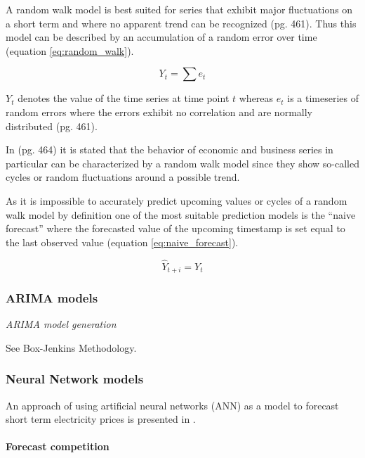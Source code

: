 A random walk model is best suited for series that exhibit major fluctuations on a short term and where no apparent trend can be recognized \cite{makridakisforecasting}(pg. 461). Thus this model can be described by an accumulation of a random error over time (equation \ref{eq:random_walk}). 

\begin{equation}
Y_t = \sum e_t
\label{eq:random_walk}
\end{equation}

$Y_t$ denotes the value of the time series at time point $t$ whereas $e_t$ is a timeseries of random errors where the errors exhibit no correlation and are normally distributed \cite{makridakisforecasting}(pg. 461). 

In \cite{makridakisforecasting}(pg. 464) it is stated that the behavior of economic and business series in particular can be characterized by a random walk model since they show so-called cycles or random fluctuations around a possible trend. 

As it is impossible to accurately predict upcoming values or cycles of a random walk model by definition one of the most suitable prediction models is the ``naive forecast'' where the forecasted value of the upcoming timestamp is set equal to the last observed value (equation \ref{eq:naive_forecast}).

\begin{equation}
\hat{Y}_{t+i} = Y_t
\label{eq:naive_forecast}
\end{equation}



\subsubsection{ARIMA models}

\emph{ARIMA model generation}

See Box-Jenkins Methodology. 


\subsubsection{Neural Network models}

An approach of using artificial neural networks (ANN) as a model to forecast short term electricity prices is presented in \cite{szkuta1999electricity}. 


\paragraph{Forecast competition}

